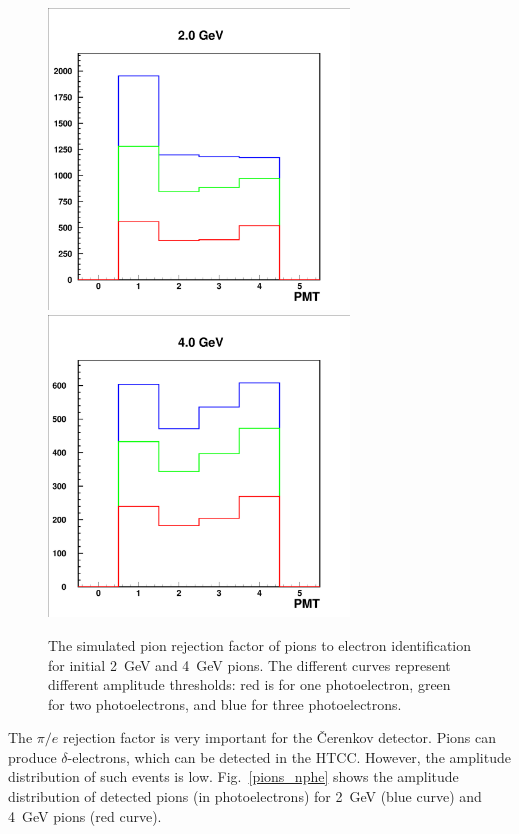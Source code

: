 \begin{figure}[htbp]
\centering
\includegraphics[height=8cm,angle=0]{MC-simulation/pions1a.eps}
\includegraphics[height=8cm,angle=0]{MC-simulation/pions1b.eps}
\caption{\small{The simulated pion rejection factor of pions to electron 
identification for initial 2~GeV and 4~GeV pions.  The different curves 
represent different amplitude thresholds: red is for one photoelectron, 
green for two photoelectrons, and blue for three photoelectrons.}}
\label{pion-rejection}
\end{figure}

The $\pi/e$ rejection factor is very important for the {\v C}erenkov 
detector.  Pions can produce $\delta$-electrons, which can be detected in 
the HTCC.  However, the amplitude distribution of such events is low. 
Fig.~\ref{pions_nphe} shows the amplitude distribution of detected pions 
(in photoelectrons) for 2~GeV (blue curve) and 4~GeV pions (red curve).

